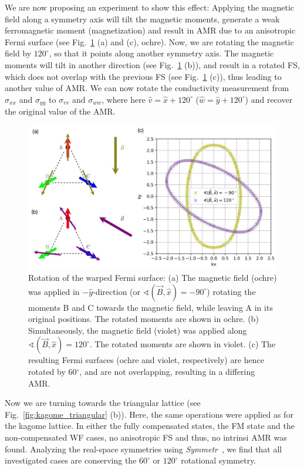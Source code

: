 \documentclass[prb,showpacs,amsmath,amssymb,superscriptaddress,twocolumn,floatfix]{revtex4-1}
\begin{document}
We are now proposing an experiment to show this effect: Applying the magnetic field along a symmetry axis will tilt the magnetic moments, generate a weak ferromagnetic moment (magnetization) and result in AMR due to an anisotropic Fermi surface (see Fig.~\ref{fig:fs-rotation} (a) and (c), ochre). Now, we are rotating the magnetic field by $120^\circ$, so that it points along another symmetry axis. The magnetic moments will tilt in another direction (see Fig.~\ref{fig:fs-rotation} (b)), and result in a rotated FS, which does not overlap with the previous FS (see Fig.~\ref{fig:fs-rotation} (c)), thus leading to another value of AMR. We can now rotate the conductivity measurement from $\sigma_{xx}$ and $\sigma_{yy}$ to $\sigma_{vv}$ and $\sigma_{ww}$, where here $\hat{v} = \hat{x} + 120^\circ$ ($\hat{w} = \hat{y} + 120^\circ$) and recover the original value of the AMR. 

\begin{figure}
	\centering
	\includegraphics[width=1\linewidth]{img/FS-rotation}
	\caption{Rotation of the warped Fermi surface: 
		(a) The magnetic field (ochre) was applied in $-\hat{y}$-direction (or $\sphericalangle (\vec{B}, \hat{x}) = -90^\circ$) rotating the moments B and C towards the magnetic field, while leaving A in its original positions. The rotated moments are shown in ochre. (b) Simultaneously, the magnetic field (violet) was applied along $\sphericalangle (\vec{B}, \hat{x}) = 120^\circ$. The rotated moments are shown in violet. (c) The resulting Fermi surfaces (ochre and violet, respectively) are hence rotated by 60$^\circ$, and are not overlapping, resulting in a differing AMR.}
	\label{fig:fs-rotation}
\end{figure}

Now we are turning towards the triangular lattice (see Fig.~\ref{fig:kagome_triangular} (b)). Here, the same operations were applied as for the kagome lattice. In either the fully compensated states, the FM state and the non-compensated WF cases, no anisotropic FS and thus, no intrinsi AMR was found. Analyzing the real-space symmetries using \textit{Symmetr}~\cite{Symmetr}, we find that all investigated cases are conserving the $60^\circ$ or $120^\circ$ rotational symmetry. 
\end{document}
